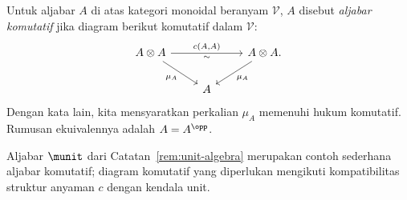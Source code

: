 \begin{definisi}\label{def:calg-monoidal}
	Untuk aljabar $A$ di atas kategori monoidal beranyam $\mathcal{V}$, $A$
	disebut \emph{aljabar komutatif} jika diagram berikut komutatif dalam
	$\mathcal{V}$:
	\[\begin{tikzcd}
		A \otimes A \arrow[rd, "{\mu_A}"'] \arrow[rr, "{c(A, A)}", "\sim"'] & & A \otimes A . \arrow[ld, "{\mu_A}"] \\
		& A &
	\end{tikzcd}\]
	Dengan kata lain, kita mensyaratkan perkalian $\mu_A$ memenuhi hukum
	komutatif. Rumusan ekuivalennya adalah $A=A^{\opp}$.
\end{definisi}

Aljabar $\munit$ dari Catatan~\ref{rem:unit-algebra} merupakan contoh sederhana
aljabar komutatif; diagram komutatif yang diperlukan mengikuti
kompatibilitas struktur anyaman $c$ dengan kendala unit.

